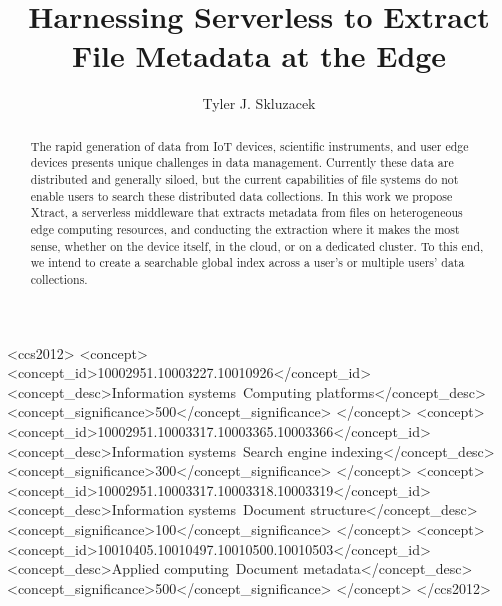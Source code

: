 \documentclass[sigconf]{acmart}
\newcommand{\tyler}[1]{}
\newcommand{\kyle}[1]{}
\newcommand{\tyler}[1]{{\textcolor{cyan}{ tyler: #1 }}}
\newcommand{\kyle}[1]{{\textcolor{purple}{ Kyle: #1 }}}
\newcommand{\name}{Xtract}
\begin{document}
\title{Harnessing Serverless to Extract File Metadata at the Edge}


\author{Tyler J. Skluzacek} 



\renewcommand{\shortauthors}{Skluzacek et al.}

\begin{abstract}
\tyler{max 100 words}




The rapid generation of data from IoT devices, scientific instruments, and user edge devices presents
unique challenges in data management. Currently these data are distributed and generally siloed, 
but the current capabilities of file systems do not enable users to search these distributed data collections.
 In this work we propose \name{}, a serverless middleware 
that extracts metadata from files on heterogeneous edge computing resources, and conducting the extraction 
where it makes the most sense, whether on the device itself, in the cloud, or on a dedicated cluster. 
To this end, we intend to create a searchable global index across a user's or multiple users' data collections.  
	
	


\end{abstract}

\begin{CCSXML}
<ccs2012>
<concept>
<concept_id>10002951.10003227.10010926</concept_id>
<concept_desc>Information systems~Computing platforms</concept_desc>
<concept_significance>500</concept_significance>
</concept>
<concept>
<concept_id>10002951.10003317.10003365.10003366</concept_id>
<concept_desc>Information systems~Search engine indexing</concept_desc>
<concept_significance>300</concept_significance>
</concept>
<concept>
<concept_id>10002951.10003317.10003318.10003319</concept_id>
<concept_desc>Information systems~Document structure</concept_desc>
<concept_significance>100</concept_significance>
</concept>
<concept>
<concept_id>10010405.10010497.10010500.10010503</concept_id>
<concept_desc>Applied computing~Document metadata</concept_desc>
<concept_significance>500</concept_significance>
</concept>
</ccs2012>
\end{CCSXML}
\end{document}
